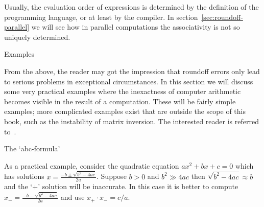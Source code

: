 Usually, the evaluation order of expressions is determined by the definition of the
programming language, or at least by the compiler.
In section~\ref{sec:roundoff-parallel} we will see how in parallel computations the associativity
is not so uniquely determined.

 {Examples}

From the above, the reader may got the impression that roundoff errors
only lead to serious problems in exceptional circumstances. In this
section we will discuss some very practical examples where the
inexactness of computer arithmetic becomes visible in the result of a
computation. These will be fairly simple examples; more complicated
examples exist that are outside the scope of this book, such as the
instability of matrix inversion. The interested reader is referred
to~\cite{Wilkinson:roundoff,Higham:2002:ASN}.

 {The `abc-formula'}
\label{sec:abc-formula}

As a practical example, consider the quadratic equation $ax^2+bx+c=0$ 
which has solutions $x=\frac{-b\pm\sqrt{b^2-4ac}}{2a}$.
Suppose $b>0$ and $b^2\gg 4ac$ then $\sqrt{b^2-4ac}\approx b$ and
the `$+$' solution will be
inaccurate. In this case it is better 
to compute $x_-=\frac{-b-\sqrt{b^2-4ac}}{2a}$ and use $x_+\cdot x_-=c/a$.


